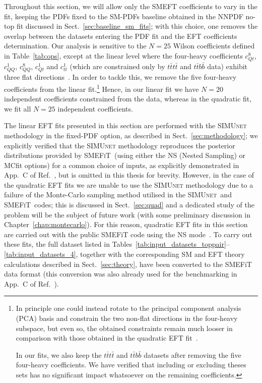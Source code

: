 \documentclass[withindex,glossary]{cam-thesis}
\newcommand{\simunet}{\textsc{SIMUnet}}
\newcommand{\smefit}{\textsc{SMEFiT}}
\begin{document}
Throughout this section, we will allow only the SMEFT coefficients to vary in the fit,
keeping the PDFs fixed to the SM-PDFs baseline obtained in the
NNPDF no-top 
fit discussed in Sect.~\ref{sec:baseline_sm_fits}; with this choice, one removes the overlap
between the datasets entering the PDF fit and the EFT coefficients determination.
%
Our analysis is sensitive to the $N=25$ Wilson coefficients defined
in Table~\ref{tab:ops}, except at the linear level where the four-heavy
coefficients $c_{Qt}^{8}$, $c_{QQ}^{1}$, $c_{QQ}^{8}$, $c_{Qt}^{1}$ and $c_{tt}^{1}$ (which are 
constrained only by $t\bar{t}t\bar{t}$ and $t\bar{t}b\bar{b}$ data)
exhibit three flat directions~\cite{Ethier:2021bye}. In order to tackle this, we remove the five four-heavy coefficients from the linear fit.\footnote{In principle one could instead rotate to the principal component analysis (PCA) basis
  and constrain the two non-flat directions in the four-heavy subspace,
  but even so, the obtained constraints
  remain much looser in comparison with those obtained in the quadratic EFT fit~\cite{Ethier:2021bye}. 
  
  In our fits, we also keep the $t\bar{t} t\bar{t}$ and $t\bar{t} b \bar{b}$ datasets after removing the five four-heavy coefficients. We 
  have verified that including or excluding theses sets has no
  significant impact whatsoever on the remaining coefficients.
}
%
Hence, in our linear fit we have $N=20$ independent coefficients constrained
from the data, whereas in the quadratic fit, we fit all $N=25$ independent coefficients.

The linear EFT fits presented in this section are performed with the \simunet{}  methodology
in the fixed-PDF option, as described in Sect.~\ref{sec:methodology}; 
we explicitly verified that the \simunet{} methodology reproduces the posterior distributions 
provided by \smefit{}~(using
either the NS (Nested Sampling) or MCfit options)
for a common choice of inputs, as explicitly demonstrated in App.~C of Ref.~\cite{Kassabov:2023hbm}, but is omitted
in this thesis for brevity.
%
However, in the case of the quadratic EFT fits we are unable to use the \simunet{} 
methodology due to a failure of the Monte-Carlo sampling method utilised in the \simunet{}~and \smefit{}~codes;
this is discussed in Sect.~\ref{sec:quad} and a dedicated study of the problem will be the subject of future work
(with some preliminary discussion in Chapter~\ref{chap:montecarlo}).
%
For this reason, quadratic EFT fits in this section are carried out
with the public {\sc\small SMEFiT} code using the NS
mode~\cite{Giani:2023gfq}. 
%
To carry out these fits, the full dataset listed in
Tables~\ref{tab:input_datasets_toppair}--\ref{tab:input_datasets_4}, together
with the corresponding SM and EFT theory calculations described in Sect.~\ref{sec:theory},
have been converted to the {\sc\small SMEFiT} data format (this conversion
was also already used for the benchmarking in App.~C of Ref.~\cite{Kassabov:2023hbm}).
\end{document}
